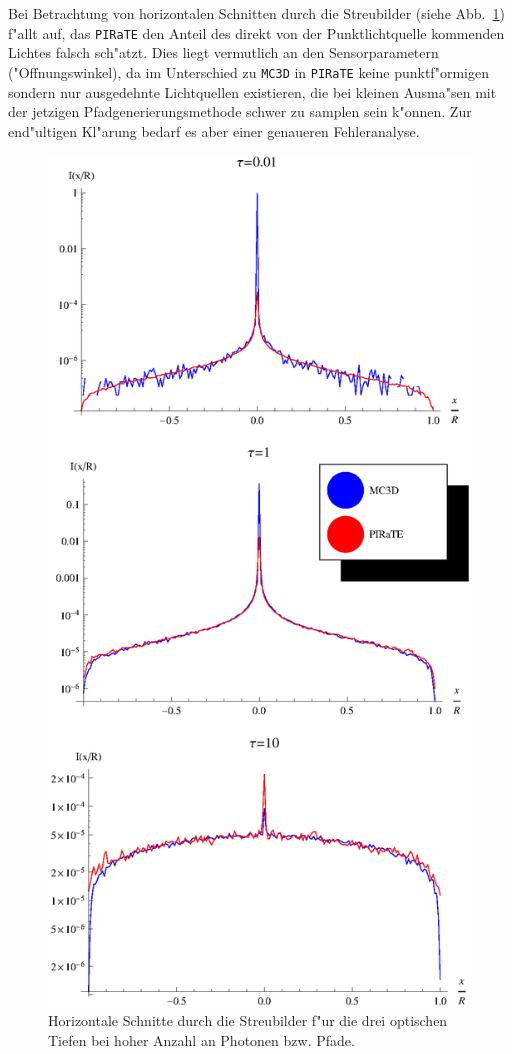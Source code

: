 	Bei Betrachtung von horizontalen Schnitten durch die Streubilder (siehe Abb.~\ref{fig:sphere_image_cuts}) f"allt auf, das \texttt{PIRaTE} den Anteil des direkt von der Punktlichtquelle kommenden Lichtes falsch sch"atzt. Dies liegt vermutlich an den Sensorparametern ("Offnungswinkel), da im Unterschied zu \texttt{MC3D} in \texttt{PIRaTE} keine punktf"ormigen sondern nur ausgedehnte Lichtquellen existieren, die bei kleinen Ausma"sen mit der jetzigen Pfadgenerierungsmethode schwer zu samplen sein k"onnen. Zur end"ultigen Kl"arung bedarf es aber einer genaueren Fehleranalyse.
	
		\begin{figure}
			\centering
			\includegraphics[height=1.0\textheight]{sphere_image_cuts.eps}
			\caption{Horizontale Schnitte durch die Streubilder f"ur die drei optischen Tiefen bei hoher Anzahl an Photonen bzw. Pfade.}
			\label{fig:sphere_image_cuts}
		\end{figure}
	
